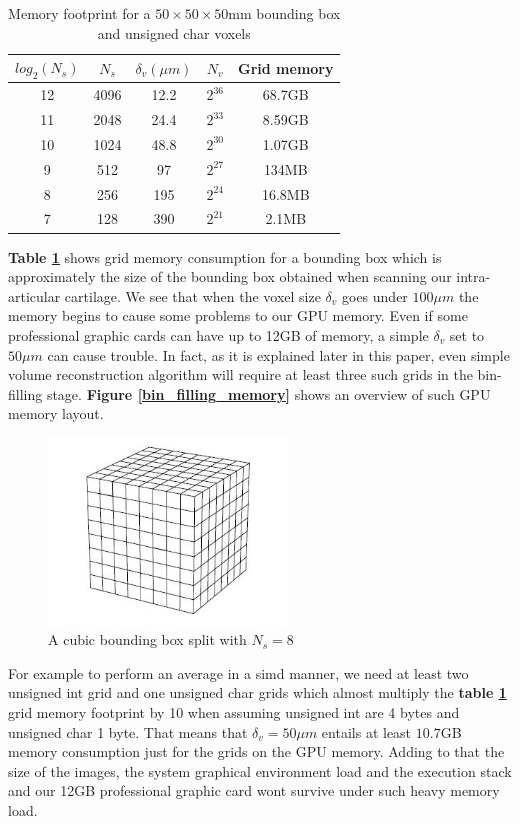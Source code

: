 \documentclass[12pt,journal,compsoc]{IEEEtran}
\begin{document}
\begin{table}[!hb]
\renewcommand{\arraystretch}{1.3}
\caption{Memory footprint for a $50\times 50\times 50$mm bounding box and unsigned char voxels}
\centering
\begin{tabular}{|c|c||c|c||c|}
\hline
$log_2(N_s)$ & $N_s$ & $\delta_v (\mu m)$ & $N_v$ & Grid memory \\
\hline
12 & 4096 & 12.2 & $2^{36}$ & 68.7GB\\\hline
11 & 2048 & 24.4 & $2^{33}$ & 8.59GB\\\hline
10 & 1024 & 48.8 & $2^{30}$ & 1.07GB\\\hline
9 & 512 & 97 & $2^{27}$ & 134MB\\\hline
8 & 256 & 195 & $2^{24}$ & 16.8MB\\\hline
7 & 128 & 390 & $2^{21}$ & 2.1MB\\\hline
\end{tabular}
\label{memory_table}
\end{table}
\textbf{Table \ref{memory_table}} shows grid memory consumption for a bounding box which is approximately the size of the bounding box obtained when scanning our intra-articular cartilage.
We see that when the voxel size $\delta_v$ goes under $100\mu m$ the memory begins to cause some problems to our GPU memory.
Even if some professional graphic cards can have up to 12GB of memory, a simple $\delta_v$ set to $50\mu m$ can cause trouble.
In fact, as it is explained later in this paper, even simple volume reconstruction algorithm will require at least three such grids in the bin-filling stage. \textbf{Figure \ref{bin_filling_memory}} shows an overview of such GPU memory layout.

\begin{figure}[!ht]
\centering
\includegraphics[width=2.5in]{grid}
\caption{A cubic bounding box split with $N_s=8$}
\label{grid}
\end{figure}

For example to perform an average in a \acl{simd} manner, we need at least two unsigned int grid and one unsigned char grids which almost multiply the \textbf{table \ref{memory_table}} grid memory footprint by 10 when assuming unsigned int are 4 bytes and unsigned char 1 byte.
That means that $\delta_v=50\mu m$ entails at least $10.7$GB memory consumption just for the grids on the GPU memory.
Adding to that the size of the images, the system graphical environment load and the execution stack and our 12GB professional graphic card wont survive under such heavy memory load.
\end{document}
